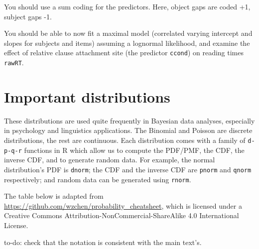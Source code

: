\documentclass[12pt,]{krantz}
\newenvironment{Shaded}{\begin{snugshade}}{\end{snugshade}}
\newcommand{\DataTypeTok}[1]{\textcolor[rgb]{0.13,0.29,0.53}{#1}}
\newcommand{\DecValTok}[1]{\textcolor[rgb]{0.00,0.00,0.81}{#1}}
\newcommand{\KeywordTok}[1]{\textcolor[rgb]{0.13,0.29,0.53}{\textbf{#1}}}
\newcommand{\NormalTok}[1]{#1}
\newcommand{\OperatorTok}[1]{\textcolor[rgb]{0.81,0.36,0.00}{\textbf{#1}}}
\newcommand{\StringTok}[1]{\textcolor[rgb]{0.31,0.60,0.02}{#1}}
\theoremstyle{definition}
\theoremstyle{definition}
\theoremstyle{definition}
\theoremstyle{remark}
\begin{document}
You should use a sum coding for the predictors. Here, object gaps are coded +1, subject gaps -1.

\begin{Shaded}
\end{Shaded}

You should be able to now fit a maximal model (correlated varying intercept and slopes for subjects and items) assuming a lognormal likelihood, and examine the effect of relative clause attachment site (the predictor \texttt{ccond}) on reading times \texttt{rawRT}.

\hypertarget{important-distributions}{%
\chapter{Important distributions}\label{important-distributions}}

These distributions are used quite frequently in Bayesian data analyses, especially in psychology and linguistics applications. The Binomial and Poisson are discrete distributions, the rest are continuous. Each distribution comes with a family of \texttt{d-p-q-r} functions in R which allow us to compute the PDF/PMF, the CDF, the inverse CDF, and to generate random data. For example, the normal distribution's PDF is \texttt{dnorm}; the CDF and the inverse CDF are \texttt{pnorm} and \texttt{qnorm} respectively; and random data can be generated using \texttt{rnorm}.

The table below is adapted from \url{https://github.com/wzchen/probability_cheatsheet}, which is licensed under a Creative Commons Attribution-NonCommercial-ShareAlike 4.0 International License.

to-do: check that the notation is consistent with the main text's.
\end{document}
